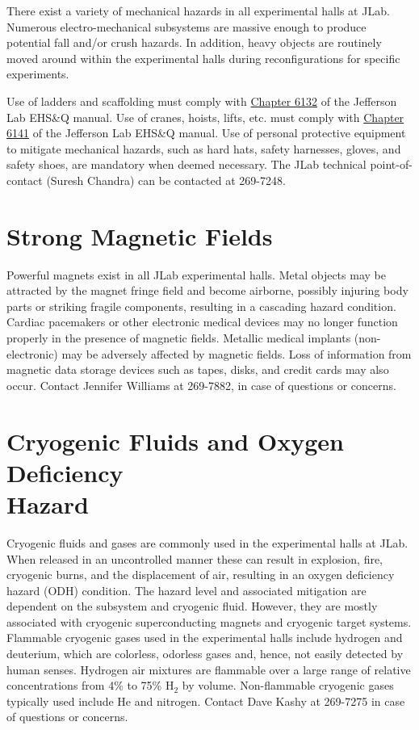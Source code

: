 \documentclass[11pt]{report}
\begin{document}
There exist a variety of mechanical hazards in all experimental halls at JLab. Numerous 
electro-mechanical subsystems are massive enough to produce potential fall and/or crush 
hazards.  In addition, heavy objects are routinely moved around within the experimental 
halls during reconfigurations for specific experiments. 

Use of ladders and scaffolding must comply with 
\href{http://www.jlab.org/ehs/ehsmanual/manual/6132.html}{Chapter 6132} of the Jefferson 
Lab EHS\&Q manual. Use of cranes, hoists, lifts, etc. must comply with
\href{http://www.jlab.org/ehs/ehsmanual/manual/6141.html}{Chapter 6141} of the Jefferson
Lab EHS\&Q manual. Use of personal protective equipment to mitigate mechanical hazards, 
such as hard hats, safety harnesses, gloves, and safety shoes, are mandatory when deemed necessary.
The JLab technical point-of-contact (Suresh Chandra) can be contacted at 269-7248.

\section{Strong Magnetic Fields}

Powerful magnets exist in all JLab experimental halls. Metal objects may be attracted 
by the magnet fringe field and become airborne, possibly injuring body parts or striking 
fragile components, resulting in a cascading hazard condition. Cardiac pacemakers or other 
electronic medical devices may no longer function properly in the presence of magnetic 
fields. Metallic medical implants (non-electronic) may be adversely affected by magnetic 
fields. Loss of information from magnetic data storage devices such as tapes, disks, and 
credit cards may also occur. Contact Jennifer Williams at 269-7882, in case of questions 
or concerns.

\section{Cryogenic Fluids and Oxygen Deficiency \\Hazard}

Cryogenic fluids and gases are commonly used in the experimental halls at JLab. When 
released in an uncontrolled manner these can result in explosion, fire, cryogenic burns, 
and the displacement of air, resulting in an oxygen deficiency hazard (ODH) condition. 
The hazard level and associated mitigation are dependent on the subsystem and cryogenic 
fluid. However, they are mostly associated with cryogenic superconducting magnets and 
cryogenic target systems. Flammable cryogenic gases used in the experimental halls 
include hydrogen and deuterium, which are colorless, odorless gases and, hence, not easily 
detected by human senses. Hydrogen air mixtures are flammable over a large range of relative 
concentrations from 4\% to 75\% H$_2$ by volume. Non-flammable cryogenic gases typically 
used include He and nitrogen. Contact Dave Kashy at 269-7275 in case of questions or concerns.
\end{document}
